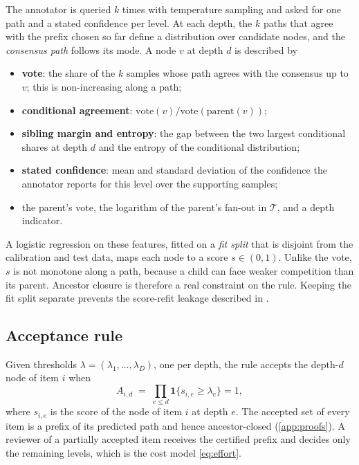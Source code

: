 \documentclass[preprint,12pt]{elsarticle}
\theoremstyle{definition}
\theoremstyle{remark}
\begin{document}
The annotator is queried $k$ times with temperature sampling and asked for one
path and a stated confidence per level. At each depth, the $k$ paths that agree
with the prefix chosen so far define a distribution over candidate nodes, and
the \emph{consensus path} follows its mode. A node $v$ at depth $d$ is described
by
\begin{itemize}
  \item \textbf{vote}: the share of the $k$ samples whose path agrees with the
  consensus up to $v$; this is non-increasing along a path;
  \item \textbf{conditional agreement}: $\mathrm{vote}(v)/\mathrm{vote}(\mathrm{parent}(v))$;
  \item \textbf{sibling margin and entropy}: the gap between the two largest
  conditional shares at depth $d$ and the entropy of the conditional
  distribution;
  \item \textbf{stated confidence}: mean and standard deviation of the
  confidence the annotator reports for this level over the supporting samples;
  \item the parent's vote, the logarithm of the parent's fan-out in
  $\mathcal{T}$, and a depth indicator.
\end{itemize}
A logistic regression on these features, fitted on a \emph{fit split} that is
disjoint from the calibration and test data, maps each node to a score
$s\in(0,1)$. Unlike the vote, $s$ is not monotone along a path, because a child
can face weaker competition than its parent. Ancestor closure is therefore a
real constraint on the rule. Keeping the fit split separate prevents the
score-refit leakage described in \cite{perfield2026}.

\subsection{Acceptance rule}
\label{sec:method-rule}

Given thresholds $\lambda=(\lambda_1,\dots,\lambda_D)$, one per depth, the rule
accepts the depth-$d$ node of item $i$ when
\begin{equation}
  A_{i,d} \;=\; \prod_{e\le d}\mathbf{1}\{s_{i,e}\ge\lambda_e\}=1,
  \label{eq:rule}
\end{equation}
where $s_{i,e}$ is the score of the node of item $i$ at depth $e$. The accepted
set of every item is a prefix of its predicted path and hence ancestor-closed
(\ref{app:proofs}). A reviewer of a partially accepted item receives the
certified prefix and decides only the remaining levels, which is the cost model
\eqref{eq:effort}.
\end{document}
